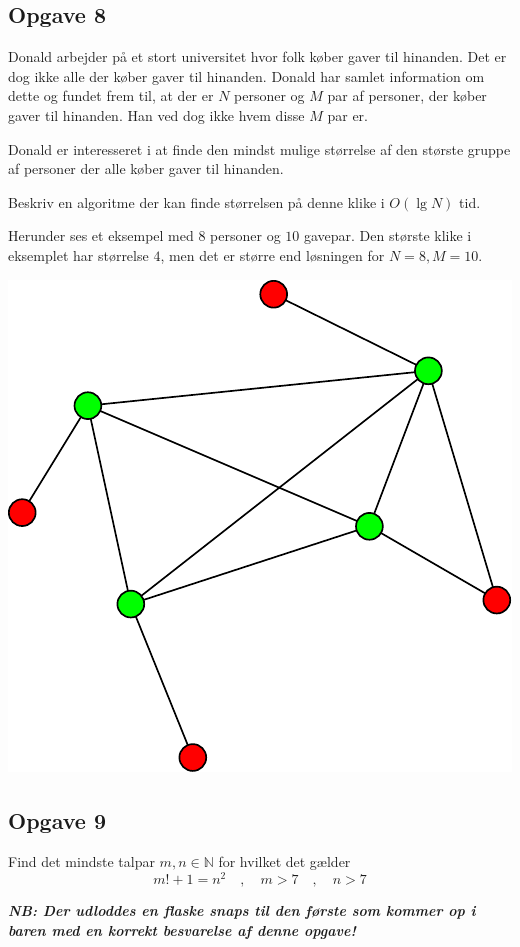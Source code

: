 \subsection{Opgave 8}
Donald arbejder på et stort universitet hvor folk køber gaver til hinanden.
Det er dog ikke alle der køber gaver til hinanden. Donald har samlet information
om dette og fundet frem til, at der er $N$ personer og $M$ par af personer, der
køber gaver til hinanden. Han ved dog ikke hvem disse $M$ par er.

Donald er interesseret i at finde den mindst mulige størrelse af den største
gruppe af personer der alle køber gaver til hinanden.

Beskriv en algoritme der kan finde størrelsen på denne klike i $O(\lg N)$
tid.

Herunder ses et eksempel med $8$ personer og $10$ gavepar. Den største klike
i eksemplet har størrelse $4$, men det er større end løsningen for $N = 8, M=10$.


\includegraphics[width=0.7\columnwidth]{turangraph}

\subsection{Opgave 9}
Find det mindste talpar $m,n \in \mathbb{N}$ for hvilket det gælder
$$
m!+1=n^2\quad,\quad m>7\quad,\quad n>7
$$

\textbf{\emph{NB: Der udloddes en flaske snaps til den første som kommer op i baren med en korrekt besvarelse af denne opgave!}}



